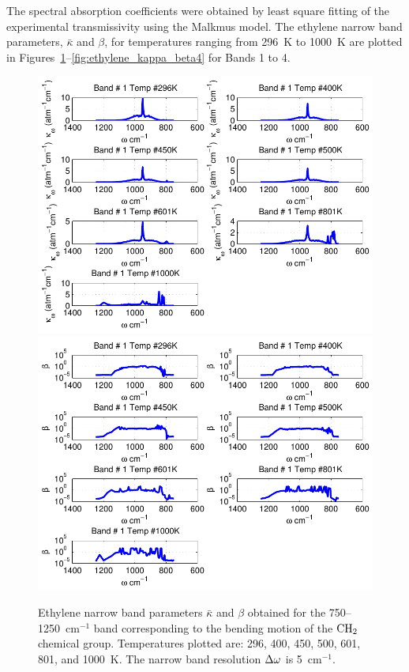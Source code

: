 The spectral absorption coefficients were obtained by least square fitting of the experimental transmissivity using the Malkmus model. The ethylene narrow band parameters, $\bar{\kappa}$ and $\beta$, for temperatures ranging from 296~K to 1000~K are plotted in Figures~\ref{fig:ethylene_kappa_beta1}--\ref{fig:ethylene_kappa_beta4} for Bands 1 to 4.

\newpage

\begin{figure}[p]
\begin{center}
\includegraphics[width=5.0in]{Figures/Ethylene_Kappa_Band1_MALKMUS.pdf}
\includegraphics[width=5.0in]{Figures/Ethylene_Beta_Band1_MALKMUS.pdf}
\end{center}
\caption{Ethylene narrow band parameters $\bar{\kappa}$ and $\beta$ obtained for the 750--1250~cm$^{-1}$ band corresponding to the bending motion of the $\rm CH_2$ chemical group. Temperatures plotted are: 296, 400, 450, 500, 601, 801, and 1000~K. The narrow band resolution $\Delta \omega$ is 5~cm$^{-1}$.\label{fig:ethylene_kappa_beta1}}
\end{figure}

